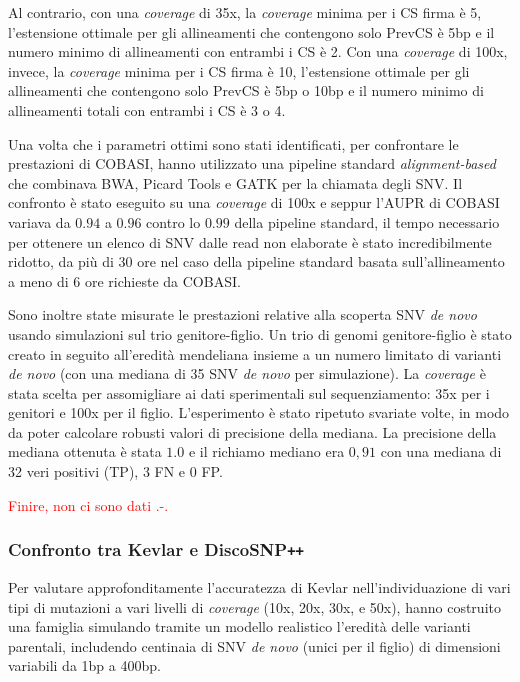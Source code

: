 \documentclass[../main.tex]{subfiles}
\begin{document}
Al contrario,  con una \textit{coverage} di 35x, la \textit{coverage} minima per i CS firma è 5, l'estensione ottimale per gli allineamenti che contengono solo PrevCS è 5bp e il numero minimo di allineamenti con entrambi i CS è 2. Con una \textit{coverage} di 100x, invece, la \textit{coverage} minima per i CS firma è 10, l'estensione ottimale per gli allineamenti che contengono solo PrevCS è 5bp o 10bp e il numero minimo di allineamenti totali con entrambi i CS è 3 o 4. 

Una volta che i parametri ottimi sono stati identificati, \cite{gomez-romero2018cobasi} per confrontare le prestazioni di COBASI, hanno utilizzato una pipeline standard \textit{alignment-based} che combinava BWA, Picard Tools e GATK per la chiamata degli SNV. Il confronto è stato eseguito su una \textit{coverage} di 100x e seppur l'AUPR di COBASI variava da $0.94$ a $0.96$ contro lo $0.99$ della pipeline standard, il tempo necessario per ottenere un elenco di SNV dalle read non elaborate è stato incredibilmente ridotto, da più di 30 ore nel caso della pipeline standard basata sull'allineamento a meno di 6 ore richieste da COBASI.

Sono inoltre state misurate le prestazioni relative alla scoperta SNV \textit{de novo} usando simulazioni sul trio genitore-figlio. Un trio di genomi genitore-figlio è stato creato in seguito all'eredità mendeliana insieme a un numero limitato di varianti \textit{de novo} (con una mediana di 35 SNV \textit{de novo} per simulazione). La \textit{coverage} è stata scelta per assomigliare ai dati sperimentali sul sequenziamento: 35x per i genitori e 100x per il figlio. L'esperimento è stato ripetuto svariate volte, in modo da poter calcolare robusti valori di precisione della mediana. La precisione della mediana ottenuta è stata $1.0$ e il richiamo mediano era $0,91$ con una mediana di 32 veri positivi (TP), 3 FN e 0 FP.

\textcolor{red}{Finire, non ci sono dati .-.}

\subsubsection{Confronto tra Kevlar e DiscoSNP\texttt{++}}

Per valutare approfonditamente l'accuratezza di Kevlar nell'individuazione di vari tipi di mutazioni a vari livelli di \textit{coverage} (10x, 20x, 30x, e 50x), \cite{standage2019kevlar} hanno costruito una famiglia simulando tramite un modello realistico l'eredità delle varianti parentali, includendo centinaia di SNV \textit{de novo} (unici per il figlio) di dimensioni variabili da 1bp a 400bp. 
\end{document}
